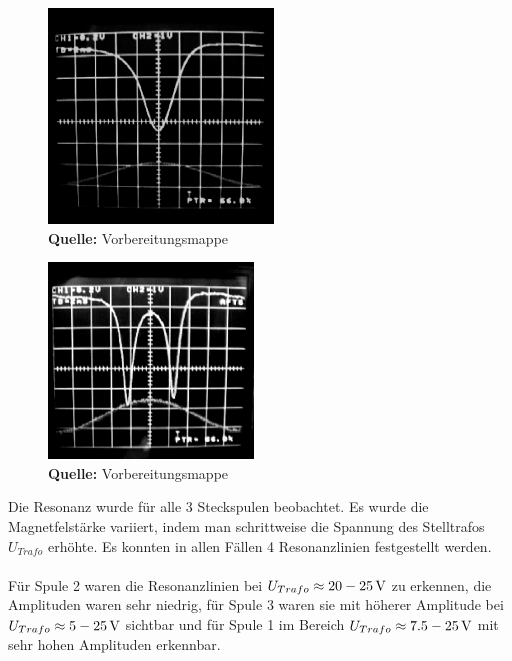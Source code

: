 \documentclass[a4paper,titlepage]{scrartcl}
\numberwithin{equation}{section}
\begin{document}
\begin{figure}[H]
\centering
\begin{minipage}{.4\textwidth}
	\centering
  	\includegraphics[width=.7\linewidth]{images/resonanz1.PNG}\\
  	\footnotesize\sffamily\textbf{Quelle:} Vorbereitungsmappe \cite{mappe}
    \captionsetup{width=0.8\textwidth}
  	\label{fig:resonanz1}
\end{minipage}%
\begin{minipage}{.4\textwidth}
	\centering
	\includegraphics[width=.7\linewidth]{images/resonanz2.PNG}\\
	\footnotesize\sffamily\textbf{Quelle:} Vorbereitungsmappe \cite{mappe}
	\captionsetup{width=0.8\textwidth}
	\label{fig:resonanz2}
\end{minipage}
\end{figure}
Die Resonanz wurde für alle 3 Steckspulen beobachtet. Es wurde die Magnetfelstärke variiert, indem man schrittweise die Spannung des Stelltrafos $U_{Trafo}$ erhöhte. Es konnten in allen Fällen 4 Resonanzlinien festgestellt werden.\\ \\
Für Spule 2 waren die Resonanzlinien bei $U_{Trafo}\approx \unit[20-25]{V}$ zu erkennen, die Amplituden waren sehr niedrig, für Spule 3 waren sie mit höherer Amplitude bei $U_{Trafo}\approx \unit[5-25]{V}$ sichtbar und für Spule 1 im Bereich $U_{Trafo}\approx \unit[7.5-25]{V}$ mit sehr hohen Amplituden erkennbar.
\end{document}
